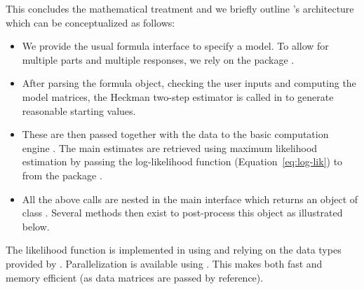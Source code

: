 \documentclass[%
    twoside, openright, titlepage, numbers=noenddot,%
    cleardoublepage=empty,%
    abstract=false,%
    BCOR=5.5mm, paper=a5, fontsize=10pt,%
]{scrreprt}
\begin{document}
This concludes the mathematical treatment and we briefly outline 's architecture which can be conceptualized as follows:
\begin{itemize}
\item We provide the usual formula interface to specify a model. To allow for multiple parts and multiple responses, we rely on the  package \citep{Zeileis+Croissant:2010}.
\item After parsing the formula object, checking the user inputs and computing the model matrices, the Heckman two-step estimator is called in  to generate reasonable starting values.
\item These are then passed together with the data to the basic computation engine . The main estimates are retrieved using maximum likelihood estimation by passing the log-likelihood function  (Equation~\ref{eq:log-lik}) to  from the  package \citep{Henningsen+Toomet:2011}.
\item All the above calls are nested in the main interface  which returns an object of class . Several methods then exist to post-process this object as illustrated below.
\end{itemize}

The likelihood function  is implemented in  using  \citep{Edelbuettel+Balamuta:2018} and relying on the data types provided by  \citep{Edelbuettel+Sanderson:2014}. Parallelization is available using . This makes  both fast and memory efficient (as data matrices are passed by reference).



\end{document}
